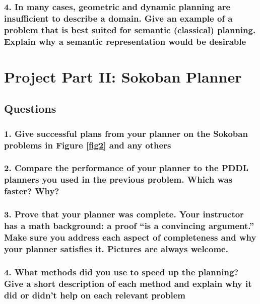 \documentclass[10pt, letter]{article}
\begin{document}
\subsubsection*{4. In many cases, geometric and dynamic planning are insufficient to describe a domain. Give
an example of a problem that is best suited for semantic (classical) planning. Explain why a
semantic representation would be desirable}


\section{Project Part II: Sokoban Planner}
\subsection{Questions}
\subsubsection*{1. Give successful plans from your planner on the Sokoban problems in Figure \ref{fig2} and any others}
\subsubsection*{2. Compare the performance of your planner to the PDDL planners you used in the previous
problem. Which was faster? Why?}
\subsubsection*{3. Prove that your planner was complete. Your instructor has a math background: a proof ``is
a convincing argument.'' Make sure you address each aspect of completeness and why your
planner satisfies it. Pictures are always welcome.}
\subsubsection*{4. What methods did you use to speed up the planning? Give a short description of each method
and explain why it did or didn't help on each relevant problem}

\end{document}

